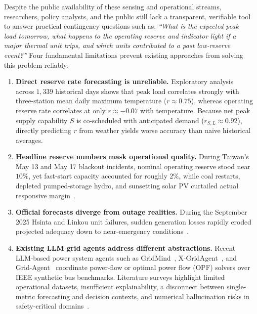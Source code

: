 \documentclass[conference]{IEEEtran}
\begin{document}
Despite the public availability of these sensing and operational streams, researchers, policy analysts, and the public still lack a transparent, verifiable tool to answer practical contingency questions such as: \textit{``What is the expected peak load tomorrow, what happens to the operating reserve and indicator light if a major thermal unit trips, and which units contributed to a past low-reserve event?''} Four fundamental limitations prevent existing approaches from solving this problem reliably:

\begin{enumerate}
    \item \textbf{Direct reserve rate forecasting is unreliable.} Exploratory analysis across $1{,}339$ historical days shows that peak load correlates strongly with three-station mean daily maximum temperature ($r \approx 0.75$), whereas operating reserve rate correlates at only $r \approx -0.07$ with temperature. Because net peak supply capability $S$ is co-scheduled with anticipated demand ($r_{S,L} \approx 0.92$), directly predicting $r$ from weather yields worse accuracy than naive historical averages.
    \item \textbf{Headline reserve numbers mask operational quality.} During Taiwan's May 13 and May 17 blackout incidents, nominal operating reserve stood near $10\%$, yet fast-start capacity accounted for roughly $2\%$, while coal restarts, depleted pumped-storage hydro, and sunsetting solar PV curtailed actual responsive margin~\cite{ref14}.
    \item \textbf{Official forecasts diverge from outage realities.} During the September 2025 Hsinta and Linkou unit failures, sudden generation losses rapidly eroded projected adequacy down to near-emergency conditions~\cite{ref9,ref10,ref12,ref13}.
    \item \textbf{Existing LLM grid agents address different abstractions.} Recent LLM-based power system agents such as GridMind~\cite{ref20}, X-GridAgent~\cite{ref21}, and Grid-Agent~\cite{ref22} coordinate power-flow or optimal power flow (OPF) solvers over IEEE synthetic bus benchmarks. Literature surveys highlight limited operational datasets, insufficient explainability, a disconnect between single-metric forecasting and decision contexts, and numerical hallucination risks in safety-critical domains~\cite{ref23,ref24}.
\end{enumerate}
\end{document}
